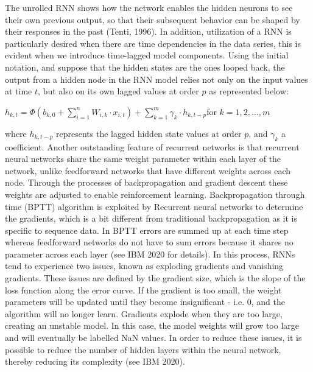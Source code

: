 \documentclass[a4paper,11pt,oneside]{book}
\begin{document}
The unrolled RNN shows how the network enables the hidden neurons to see their
own previous output, so that their subsequent behavior can be shaped by their responses in the past (Tenti, 1996). In addition, utilization of a RNN is particularly desired when there are
time dependencies in the data series, this is evident when we introduce time-lagged model components. Using the initial notation, and suppose that the hidden states are the ones looped
back, the output from a hidden node in the RNN model relies not only on the input values at
time $t$, but also on its own lagged values at order $p$ as represented below:

\begin{center}
	$h_{k,t} =\Phi(b_{k,0} + \sum_{i=1}^{n} W_{i,k} \cdot x_{i,t}) + \sum_{k=1}^{m} \gamma_{k} \cdot h_{k,t-p}$for $k = 1,2,...,m$
\end{center}

where $h_{k,t-p}$ represents the lagged hidden state values at order $p$, and $\gamma_{k}$ a coefficient. Another outstanding feature of recurrent networks is that recurrent neural networks share the same weight parameter within each layer of the network, unlike feedforward networks that have different weights across each node. Through the processes of backpropagation and gradient descent these weights are adjusted to enable reinforcement learning.  Backpropagation through time (BPTT) algorithm is exploited by Recurrent neural networks to determine the gradients, which is a bit different from traditional backpropagation as it is specific to sequence data. In BPTT errors are summed up at each time step whereas feedforward networks do not have to sum errors because it shares no parameter across each layer (see IBM 2020 for details).\newline\newline
In this process, RNNs tend to experience two issues, known as exploding gradients and vanishing gradients. These issues are defined by the gradient size, which is the slope of the loss function along the error curve. If the gradient is too small, the weight parameters will be updated until they become insignificant - i.e. 0, and the algorithm will no longer learn. Gradients explode when they are too large, creating an unstable model. In this case, the model weights will grow too large and will eventually be labelled NaN values. In order to reduce these issues, it is possible to reduce the number of hidden layers within the neural network, thereby reducing its complexity (see IBM 2020).
\end{document}
